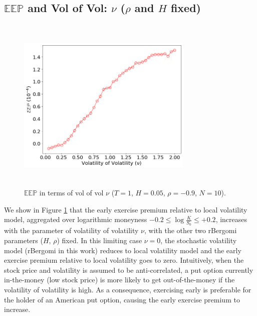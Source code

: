 \documentclass[12pt]{article}
\numberwithin{equation}{section}
\begin{document}
\subsection{$\mathbb{EEP}$ and Vol of Vol: $\nu$ ($\rho$ and $H$ fixed)}
\begin{figure}[!htb]
\begin{center}
  \includegraphics[width=0.75\textwidth, height=8.5cm]{eep_vv}
\caption{$\mathbb{EEP}$ in terms of vol of vol $\nu$ ($T=1$, $H=0.05$, $\rho=-0.9$, $N=10$).}
\label{fig:eep_vv}
\end{center}
\end{figure}
We show in Figure \ref{fig:eep_vv} that the early exercise premium relative to local volatility model, aggregated over logarithmic moneyness $-0.2\le\log \frac{K}{S_0}\le +0.2$, increases with the parameter of volatility of volatility $\nu$, with the other two rBergomi parameters ($H$, $\rho$) fixed. In this limiting case $\nu = 0$, the stochastic volatility model (rBergomi in this work) reduces to local volatility model and the early exercise premium relative to local volatility goes to zero. Intuitively, when the stock price and volatility is assumed to be anti-correlated, a put option currently in-the-money (low stock price) is more likely to get out-of-the-money if the volatility of volatility is high. As a consequence, exercising early is preferable for the holder of an American put option, causing the early exercise premium to increase.

\end{document}

